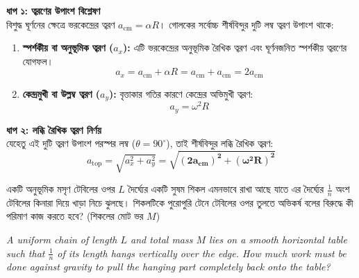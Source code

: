 \documentclass[12pt, a4paper]{article}
\begin{document}
{%
\begin{tcolorbox}[solutionbox={সমাধান (Solution)}]
    \noindent
    \textbf{ধাপ ১: ত্বরণের উপাংশ বিশ্লেষণ} \\
    বিশুদ্ধ ঘূর্ণনের ক্ষেত্রে ভরকেন্দ্রের ত্বরণ $a_{\text{cm}} = \alpha R$। গোলকের সর্বোচ্চ শীর্ষবিন্দুর দুটি লম্ব ত্বরণ উপাংশ থাকে:
    
    \begin{enumerate}[topsep=0pt, itemsep=2pt]
        \item \textbf{স্পর্শকীয় বা অনুভূমিক ত্বরণ ($a_x$):} এটি ভরকেন্দ্রের অনুভূমিক রৈখিক ত্বরণ এবং ঘূর্ণনজনিত স্পর্শকীয় ত্বরণের যোগফল।
        \[ a_x = a_{\text{cm}} + \alpha R = a_{\text{cm}} + a_{\text{cm}} = 2a_{\text{cm}} \]
        \item \textbf{কেন্দ্রমুখী বা উল্লম্ব ত্বরণ ($a_y$):} বৃত্তাকার গতির কারণে কেন্দ্রের অভিমুখী ত্বরণ:
        \[ a_y = \omega^2 R \]
    \end{enumerate}
    
    \vspace{0.5em}
    \noindent\textbf{ধাপ ২: লব্ধি রৈখিক ত্বরণ নির্ণয়} \\
    যেহেতু এই দুটি ত্বরণ উপাংশ পরস্পর লম্ব ($\theta = 90^\circ$), তাই শীর্ষবিন্দুর লব্ধি রৈখিক ত্বরণ:
    \[ a_{\text{top}} = \sqrt{a_x^2 + a_y^2} = \mathbf{\sqrt{(2a_{\text{cm}})^2 + (\omega^2 R)^2}} \]
\end{tcolorbox}

\newpage

\begin{tcolorbox}[questionbox={প্রশ্ন (Question) 8}]
    \noindent
    একটি অনুভূমিক মসৃণ টেবিলের ওপর $L$ দৈর্ঘ্যের একটি সুষম শিকল এমনভাবে রাখা আছে যাতে এর দৈর্ঘ্যের $\frac{1}{n}$ অংশ টেবিলের কিনারা দিয়ে খাড়া নিচে ঝুলছে। শিকলটিকে পুরোপুরি টেনে টেবিলের ওপর তুলতে অভিকর্ষ বলের বিরুদ্ধে কী পরিমাণ কাজ করতে হবে? (শিকলের মোট ভর $M$)
    
    \vspace{0.8em}
    \begin{english}
    \noindent\textit{\color{darkgray}
    A uniform chain of length $L$ and total mass $M$ lies on a smooth horizontal table such that $\frac{1}{n}$ of its length hangs vertically over the edge. How much work must be done against gravity to pull the hanging part completely back onto the table?
    }
    \end{english}
\end{tcolorbox}

}
\end{document}
